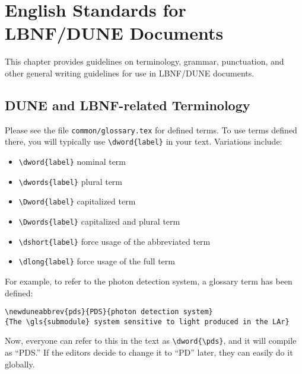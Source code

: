 \chapter{English Standards for LBNF/DUNE Documents}
\label{ch:english}

This chapter provides guidelines on terminology, grammar, punctuation, and other general writing guidelines for use in LBNF/DUNE documents. 


\section{DUNE and LBNF-related Terminology}
\label{sec:english-terminology}

Please see the file \verb|common/glossary.tex| for defined terms. To use terms defined there, you will typically use \verb|\dword{label}| in your text.  Variations include:

\begin{itemize}
\item \verb|\dword{label}| nominal term
\item \verb|\dwords{label}| plural term
\item \verb|\Dword{label}| capitalized term
\item \verb|\Dwords{label}| capitalized and plural term
\item \verb|\dshort{label}| force usage of the abbreviated term
\item \verb|\dlong{label}| force usage of the full term
\end{itemize}

For example, to refer to the photon detection system, a glossary term has been defined:

\verb|\newduneabbrev{pds}{PDS}{photon detection system}| \\
\verb|{The \gls{submodule} system sensitive to light produced in the LAr}|

Now, everyone can refer to this in the text as \verb|\dword{\pds}|, and it will compile as ``PDS.''  If the editors decide to change it to ``PD'' later, they can easily do it globally.


